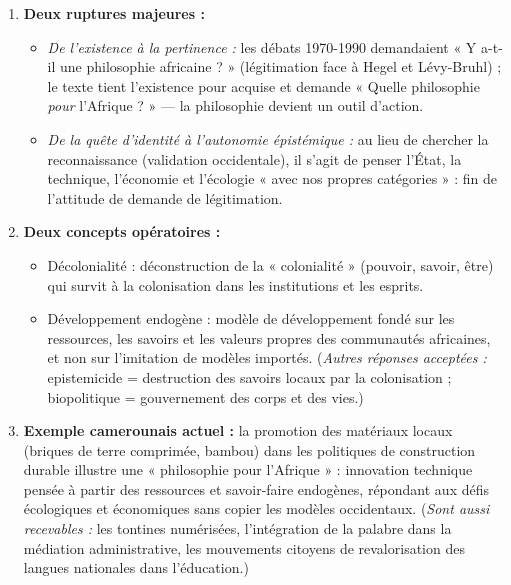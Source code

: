 \documentclass[11pt]{article}
\newcommand{\cle}[1]{{\popxbold\color{popdark}#1}}
\begin{document}
\begin{corrige}
\begin{enumerate}
    \item \textbf{Deux ruptures majeures :}
    \begin{itemize}
        \item \emph{De l'existence à la pertinence :} les débats 1970-1990 demandaient « Y a-t-il une philosophie africaine ? » (légitimation face à Hegel et Lévy-Bruhl) ; le texte tient l'existence pour acquise et demande « Quelle philosophie \emph{pour} l'Afrique ? » — la philosophie devient un outil d'action.
        \item \emph{De la quête d'identité à l'autonomie épistémique :} au lieu de chercher la reconnaissance (validation occidentale), il s'agit de penser l'État, la technique, l'économie et l'écologie « avec nos propres catégories » : fin de l'attitude de demande de légitimation.
    \end{itemize}
    \item \textbf{Deux concepts opératoires :}
    \begin{itemize}
        \item \cle{Décolonialité} : déconstruction de la « colonialité » (pouvoir, savoir, être) qui survit à la colonisation dans les institutions et les esprits.
        \item \cle{Développement endogène} : modèle de développement fondé sur les ressources, les savoirs et les valeurs propres des communautés africaines, et non sur l'imitation de modèles importés. (\emph{Autres réponses acceptées :} \cle{epistemicide} = destruction des savoirs locaux par la colonisation ; \cle{biopolitique} = gouvernement des corps et des vies.)
    \end{itemize}
    \item \textbf{Exemple camerounais actuel :} la promotion des matériaux locaux (briques de terre comprimée, bambou) dans les politiques de construction durable illustre une « philosophie pour l'Afrique » : innovation technique pensée à partir des ressources et savoir-faire endogènes, répondant aux défis écologiques et économiques sans copier les modèles occidentaux. (\emph{Sont aussi recevables :} les tontines numérisées, l'intégration de la palabre dans la médiation administrative, les mouvements citoyens de revalorisation des langues nationales dans l'éducation.)
\end{enumerate}
\end{corrige}
\end{document}

